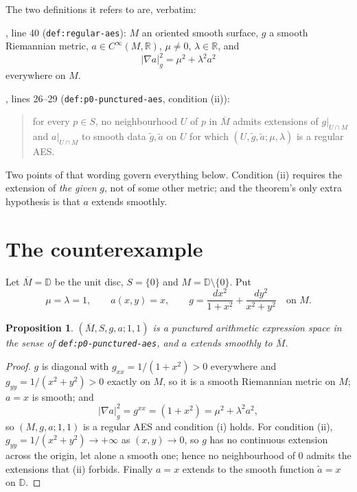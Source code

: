 \documentclass[11pt]{article}
\newtheorem{proposition}[theorem]{Proposition}
\begin{document}
The two definitions it refers to are, verbatim:

, line 40
(\texttt{def:regular-aes}): $M$ an oriented smooth surface, $g$ a smooth
Riemannian metric, $a\in C^\infty(M,\mathbb R)$, $\mu\ne0$, $\lambda\in\mathbb R$,
and
\[
|\nabla a|_g^2=\mu^2+\lambda^2a^2
\]
everywhere on $M$.

, lines 26--29
(\texttt{def:p0-punctured-aes}, condition (ii)):

\begin{quote}
for every $p\in S$, no neighbourhood $U$ of $p$ in $\overline M$ admits
extensions of $g|_{U\cap M}$ and $a|_{U\cap M}$ to smooth data
$\widetilde g,\widetilde a$ on $U$ for which
$(U,\widetilde g,\widetilde a;\mu,\lambda)$ is a regular AES.
\end{quote}

Two points of that wording govern everything below. Condition (ii) requires the
extension of \emph{the given} $g$, not of some other metric; and the theorem's
only extra hypothesis is that \emph{$a$} extends smoothly.

\section{The counterexample}
\label{sec:model}

Let $\overline M=\mathbb D$ be the unit disc, $S=\{0\}$ and
$M=\mathbb D\setminus\{0\}$. Put
\[
\mu=\lambda=1,\qquad a(x,y)=x,\qquad
g=\frac{dx^2}{1+x^2}+\frac{dy^2}{x^2+y^2}\quad\text{on }M .
\]

\begin{proposition}
\label{prop:is-punctured-aes}
$(\overline M,S,g,a;1,1)$ is a punctured arithmetic expression space in the sense
of \texttt{def:p0-punctured-aes}, and $a$ extends smoothly to $\overline M$.
\end{proposition}

\begin{proof}
$g$ is diagonal with $g_{xx}=1/(1+x^2)>0$ everywhere and
$g_{yy}=1/(x^2+y^2)>0$ exactly on $M$, so it is a smooth Riemannian metric on
$M$; $a=x$ is smooth; and
\[
|\nabla a|_g^2=g^{xx}=(1+x^2)=\mu^2+\lambda^2a^2 ,
\]
so $(M,g,a;1,1)$ is a regular AES and condition (i) holds. For condition (ii),
$g_{yy}=1/(x^2+y^2)\to+\infty$ as $(x,y)\to0$, so $g$ has no continuous
extension across the origin, let alone a smooth one; hence no neighbourhood of
$0$ admits the extensions that (ii) forbids. Finally $a=x$ extends to the smooth
function $\widetilde a=x$ on $\mathbb D$.
\end{proof}
\end{document}
